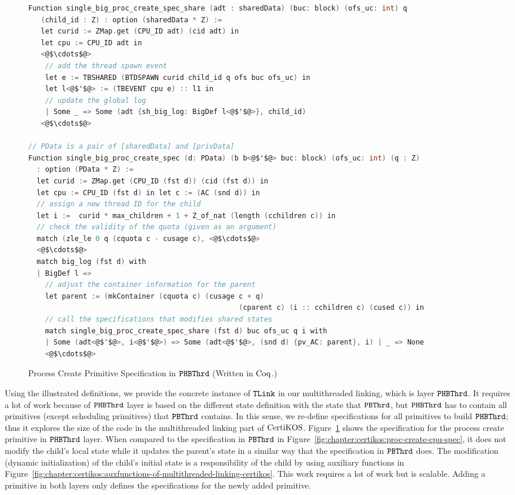 \begin{figure}
\begin{lstlisting}[language=C, deletekeywords={int}]
Function single_big_proc_create_spec_share (adt : sharedData) (buc: block) (ofs_uc: int) q
   (child_id : Z) : option (sharedData * Z) :=
   let curid := ZMap.get (CPU_ID adt) (cid adt) in
   let cpu := CPU_ID adt in
   <@$\cdots$@>
    // add the thread spawn event
    let e := TBSHARED (BTDSPAWN curid child_id q ofs buc ofs_uc) in
    let l<@$'$@> := (TBEVENT cpu e) :: l1 in
    // update the global log
    | Some _ => Some (adt {sh_big_log: BigDef l<@$'$@>}, child_id)
   <@$\cdots$@>
      
// PData is a pair of [sharedData] and [privData]
Function single_big_proc_create_spec (d: PData) (b b<@$'$@> buc: block) (ofs_uc: int) (q : Z) 
  : option (PData * Z) :=
  let curid := ZMap.get (CPU_ID (fst d)) (cid (fst d)) in
  let cpu := CPU_ID (fst d) in let c := (AC (snd d)) in
  // assign a new thread ID for the child
  let i :=  curid * max_children + 1 + Z_of_nat (length (cchildren c)) in
  // check the validity of the quota (given as an argument)
  match (zle_le 0 q (cquota c - cusage c), <@$\cdots$@>
  <@$\cdots$@>
  match big_log (fst d) with
  | BigDef l =>
    // adjust the container information for the parent
    let parent := (mkContainer (cquota c) (cusage c + q)
                                                  (cparent c) (i :: cchildren c) (cused c)) in
    // call the specifications that modifies shared states 
    match single_big_proc_create_spec_share (fst d) buc ofs_uc q i with
    | Some (adt<@$'$@>, i<@$'$@>) => Some (adt<@$'$@>, (snd d) {pv_AC: parent}, i) | _ => None
    <@$\cdots$@>       
\end{lstlisting}
\caption{Process Create Primitive Specification in ${{\mathrm{\texttt{PHBThrd}}}}$ (Written in $\mathrm{Coq}$.)}
\label{fig:chapter:certikos:proc-create-cpu-spec-phbthred}
\end{figure}

Using the illustrated definitions, we provide the concrete instance of ${{\mathrm{\texttt{TLink}}}}$ in our multithreaded linking,
which is layer ${{\mathrm{\texttt{PHBThrd}}}}$. 
It requires a lot of work because of  
${{\mathrm{\texttt{PHBThrd}}}}$ layer is based on the different state definition with the state that 
${{\mathrm{\texttt{PBThrd}}}}$, 
but ${{\mathrm{\texttt{PHBThrd}}}}$ has to contain all primitives (except scheduling primitives)
that ${{\mathrm{\texttt{PBThrd}}}}$ contains.
In this sense, 
we re-define specifications for all primitives to build ${{\mathrm{\texttt{PHBThrd}}}}$; thus it explores the size of the code in the multithreaded linking part of $\mathrm{CertiKOS}$.
Figure~\ref{fig:chapter:certikos:proc-create-cpu-spec-phbthred} shows the specification for the process create primitive in ${{\mathrm{\texttt{PHBThrd}}}}$ layer.
When compared to the specification in ${{\mathrm{\texttt{PBThrd}}}}$ in Figure~\ref{fig:chapter:certikos:proc-create-cpu-spec},
 it does not modify the child's local state while it updates the 
 parent's state in a similar way that the specification in ${{\mathrm{\texttt{PBThrd}}}}$ does.
The modification (dynamic initialization) of the child's initial state is a responsibility of the child by using auxiliary functions in Figure~\ref{fig:chapter:certikos:auxfunctions-of-multithreaded-linking-certikos}.
This work requires a lot of work but is scalable.
Adding a primitive in both layers only defines the specifications for the newly added primitive.


